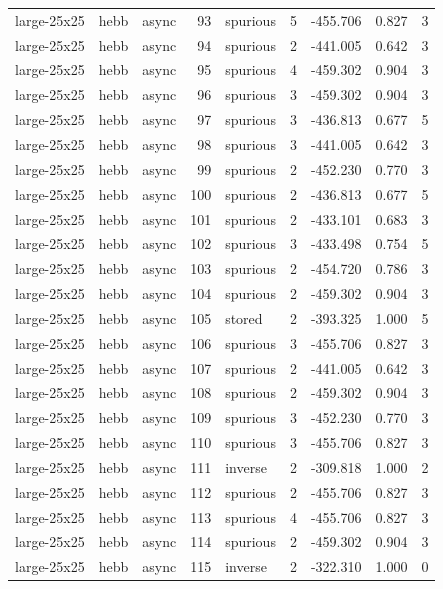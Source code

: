 \begin{tabular}{lllrlrrrr}
large-25x25 & hebb & async & 93 & spurious & 5 & -455.706 & 0.827 & 3 \\
large-25x25 & hebb & async & 94 & spurious & 2 & -441.005 & 0.642 & 3 \\
large-25x25 & hebb & async & 95 & spurious & 4 & -459.302 & 0.904 & 3 \\
large-25x25 & hebb & async & 96 & spurious & 3 & -459.302 & 0.904 & 3 \\
large-25x25 & hebb & async & 97 & spurious & 3 & -436.813 & 0.677 & 5 \\
large-25x25 & hebb & async & 98 & spurious & 3 & -441.005 & 0.642 & 3 \\
large-25x25 & hebb & async & 99 & spurious & 2 & -452.230 & 0.770 & 3 \\
large-25x25 & hebb & async & 100 & spurious & 2 & -436.813 & 0.677 & 5 \\
large-25x25 & hebb & async & 101 & spurious & 2 & -433.101 & 0.683 & 3 \\
large-25x25 & hebb & async & 102 & spurious & 3 & -433.498 & 0.754 & 5 \\
large-25x25 & hebb & async & 103 & spurious & 2 & -454.720 & 0.786 & 3 \\
large-25x25 & hebb & async & 104 & spurious & 2 & -459.302 & 0.904 & 3 \\
large-25x25 & hebb & async & 105 & stored & 2 & -393.325 & 1.000 & 5 \\
large-25x25 & hebb & async & 106 & spurious & 3 & -455.706 & 0.827 & 3 \\
large-25x25 & hebb & async & 107 & spurious & 2 & -441.005 & 0.642 & 3 \\
large-25x25 & hebb & async & 108 & spurious & 2 & -459.302 & 0.904 & 3 \\
large-25x25 & hebb & async & 109 & spurious & 3 & -452.230 & 0.770 & 3 \\
large-25x25 & hebb & async & 110 & spurious & 3 & -455.706 & 0.827 & 3 \\
large-25x25 & hebb & async & 111 & inverse & 2 & -309.818 & 1.000 & 2 \\
large-25x25 & hebb & async & 112 & spurious & 2 & -455.706 & 0.827 & 3 \\
large-25x25 & hebb & async & 113 & spurious & 4 & -455.706 & 0.827 & 3 \\
large-25x25 & hebb & async & 114 & spurious & 2 & -459.302 & 0.904 & 3 \\
large-25x25 & hebb & async & 115 & inverse & 2 & -322.310 & 1.000 & 0 \\

\end{tabular}

